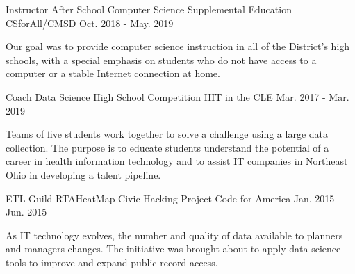 
\begin{cventries}

  \cventry
    {Instructor} %
    {After School Computer Science Supplemental Education} %
    {CSforAll/CMSD} %
    {Oct. 2018 - May. 2019} %
    {
      \begin{cvcompactparagraph}
        Our goal was to provide computer science instruction in all of the District's high schools, with a special emphasis on students who do not have access to a computer or a stable Internet connection at home.
      \end{cvcompactparagraph}
    }

  \cventry
    {Coach} %
    {Data Science High School Competition} %
    {HIT in the CLE} %
    {Mar. 2017 - Mar. 2019} %
    {
      \begin{cvcompactparagraph}
        Teams of five students work together to solve a challenge using a large data collection. The purpose is to educate students understand the potential of a career in health information technology and to assist IT companies in Northeast Ohio in developing a talent pipeline.
      \end{cvcompactparagraph}
    }

  \cventry
    {ETL Guild} %
    {RTAHeatMap Civic Hacking Project} %
    {Code for America} %
    {Jan. 2015 - Jun. 2015} %
    {
      \begin{cvcompactparagraph}
        As IT technology evolves, the number and quality of data available to planners and managers changes. The initiative was brought about to apply data science tools to improve and expand public record access.
      \end{cvcompactparagraph}
    }


\end{cventries}
